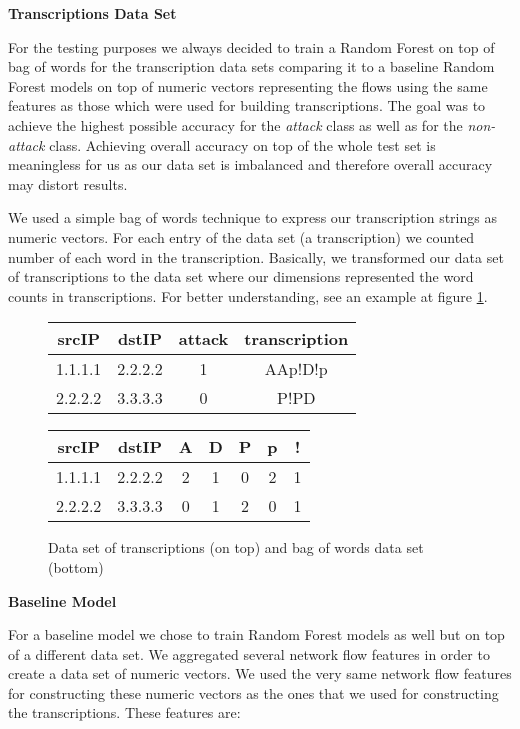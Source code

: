 \documentclass{article}
\begin{document}
\noindent\textbf{Transcriptions Data Set}

For the testing purposes we always decided to train a Random Forest on top of bag of words for the transcription data sets comparing it to a baseline Random Forest models on top of numeric vectors representing the flows using the same features as those which were used for building transcriptions. The goal was to achieve the highest possible accuracy for the \textit{attack} class as well as for the \textit{non-attack} class. Achieving overall accuracy on top of the whole test set is meaningless for us as our data set is imbalanced and therefore overall accuracy may distort results.

We used a simple bag of words technique to express our transcription strings as numeric vectors. For each entry of the data set (a transcription) we counted number of each word in the transcription. Basically, we transformed our data set of transcriptions to the data set where our dimensions represented the word counts in transcriptions. For better understanding, see an example at figure \ref{fig-bag-of-words-example}.

\begin{figure}[h!]
\centering
\begin{tabular}{ |c|c|c|c| }
 \hline
 srcIP & dstIP & attack & transcription \\
 \hline
 1.1.1.1 & 2.2.2.2 & 1 & AAp!D!p \\
 2.2.2.2 & 3.3.3.3 & 0 & P!PD \\
 \hline
\end{tabular}

\vspace{0.3cm}

\begin{tabular}{ |c|c|c|c|c|c|c| }
 \hline
 srcIP & dstIP & A & D & P & p & ! \\
 \hline
 1.1.1.1 & 2.2.2.2 & 2 & 1 & 0 & 2 & 1 \\
 2.2.2.2 & 3.3.3.3 & 0 & 1 & 2 & 0 & 1 \\
 \hline
\end{tabular}
\caption{Data set of transcriptions (on top) and bag of words data set (bottom)}
\label{fig-bag-of-words-example}
\end{figure}


\noindent\textbf{Baseline Model}

\noindent For a baseline model we chose to train Random Forest models as well but on top of a different data set. We aggregated several network flow features in order to create a data set of numeric vectors. We used the very same network flow features for constructing these numeric vectors as the ones that we used for constructing the transcriptions. These features are:
\end{document}
